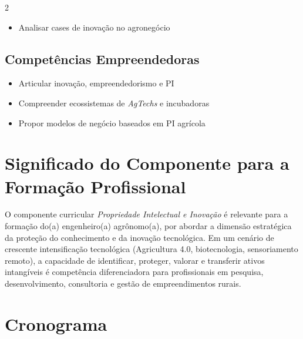 \documentclass[11pt,a4paper]{article}
\begin{document}
\begin{multicols}{2}
\begin{itemize}
\item Analisar cases de inovação no agronegócio

\end{itemize}

\subsection*{Competências Empreendedoras}

\begin{itemize}

\item Articular inovação, empreendedorismo e PI

\item Compreender ecossistemas de \textit{AgTechs} e incubadoras

\item Propor modelos de negócio baseados em PI agrícola

\end{itemize}

\end{multicols}

\section*{Significado do Componente para a Formação Profissional}

O componente curricular \textit{Propriedade Intelectual e Inovação} é relevante para a formação do(a) engenheiro(a) agrônomo(a), por abordar a dimensão estratégica da proteção do conhecimento e da inovação tecnológica. Em um cenário de crescente intensificação tecnológica (Agricultura 4.0, biotecnologia, sensoriamento remoto), a capacidade de identificar, proteger, valorar e transferir ativos intangíveis é competência diferenciadora para profissionais em pesquisa, desenvolvimento, consultoria e gestão de empreendimentos rurais.

\section*{Cronograma}
\end{document}
